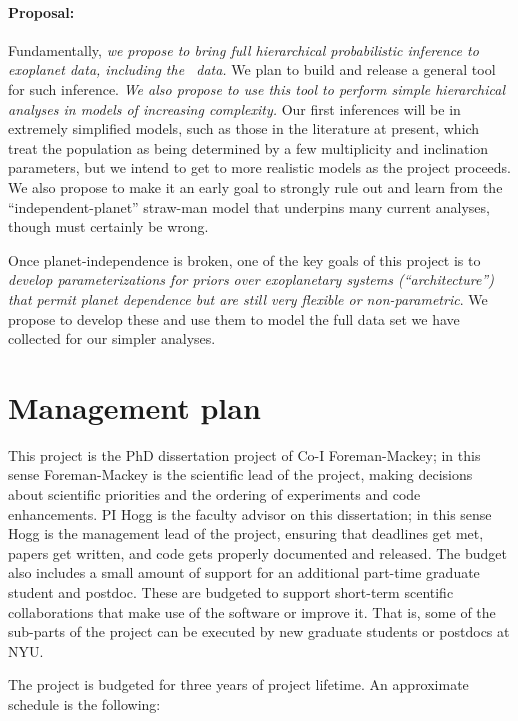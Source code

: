\documentclass[letterpaper,12pt,preprint]{hack_aastex}
\begin{document}
\paragraph{Proposal:}
Fundamentally, \emph{we propose to bring full hierarchical
  probabilistic inference to exoplanet data, including the
  \Kepler\ data.}  We plan to build and release a general tool for
such inference.  \emph{We also propose to use this tool to perform
  simple hierarchical analyses in models of increasing complexity.}
Our first inferences will be in extremely simplified models, such as
those in the literature at present, which treat the population as
being determined by a few multiplicity and inclination parameters, but
we intend to get to more realistic models as the project proceeds.  We
also propose to make it an early goal to strongly rule out and learn
from the ``independent-planet'' straw-man model that underpins many
current analyses, though must certainly be wrong.

Once planet-independence is broken, one of the key goals of this
project is to \emph{develop parameterizations for priors over
  exoplanetary systems (``architecture'') that permit planet
  dependence but are still very flexible or non-parametric}.  We
propose to develop these and use them to model the full data set we
have collected for our simpler analyses.


\section{Management plan}

This project is the PhD dissertation project of Co-I Foreman-Mackey;
in this sense Foreman-Mackey is the scientific lead of the project,
making decisions about scientific priorities and the ordering of
experiments and code enhancements.  PI Hogg is the faculty advisor on
this dissertation; in this sense Hogg is the management lead of the
project, ensuring that deadlines get met, papers get written, and code
gets properly documented and released.  The budget also includes a
small amount of support for an additional part-time graduate student
and postdoc.  These are budgeted to support short-term scentific
collaborations that make use of the software or improve it.  That is,
some of the sub-parts of the project can be executed by new graduate
students or postdocs at NYU.

The project is budgeted for three years of project lifetime.  An
approximate schedule is the following:
\end{document}
